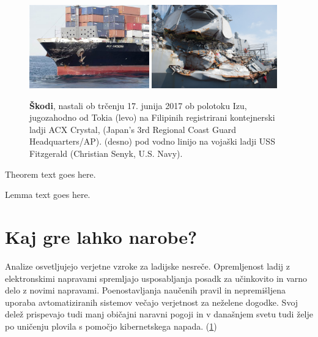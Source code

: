 \begin{figure}
	\centering
	\includegraphics[height=3.6cm]{Predavanja/05_SatLastPolozaj/figs/170616UssFitzgeraldShipCollision.jpg}
	\hspace*{0.5cm}
	\includegraphics[height=3.6cm]{Predavanja/05_SatLastPolozaj/figs/170713NNT265025.jpg}%
	\caption{ \textbf{Škodi}, nastali ob trčenju 17. junija 2017 ob polotoku Izu, jugozahodno od Tokia (levo) na Filipinih registrirani kontejnerski ladji ACX Crystal, (Japan’s 3rd Regional Coast Guard Headquarters/AP). (desno) pod vodno linijo na vojaški ladji USS Fitzgerald (Christian Senyk, U.S. Navy).} %
	\label{fig:Gnss_Polozaj:poslediceTrcenja}       %
\end{figure} 




%
%
\begin{theorem}
Theorem text goes here.
\end{theorem}
%
%
\begin{lemma}
Lemma text goes here.
\end{lemma}
%
%
\section{Kaj gre lahko narobe?}
Analize osvetljujejo verjetne vzroke za ladijske nesreče. Opremljenost ladij z elektronskimi napravami spremljajo usposabljanja posadk za učinkovito in varno delo z novimi napravami. Poenostavljanja naučenih pravil in nepremišljena uporaba avtomatiziranih sistemov večajo verjetnost za neželene dogodke. Svoj delež prispevajo tudi manj običajni naravni pogoji in v današnjem svetu tudi želje po uničenju plovila s pomočjo kibernetskega napada. (\ref{fig:Gnss_Polozaj:poslediceTrcenja})    

